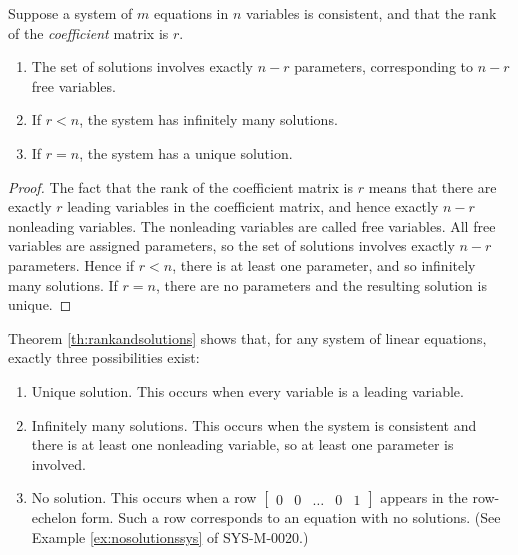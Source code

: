 \documentclass{ximera}
\begin{document}
\begin{theorem}\label{th:rankandsolutions}
Suppose a system of $m$ equations in $n$ variables is consistent, and that the rank of the {\it coefficient} matrix is $r$.

\begin{enumerate}
\item The set of solutions involves exactly $n - r$ parameters, corresponding to $n-r$ free variables.

\item If $r < n$, the system has infinitely many solutions.

\item If $r = n$, the system has a unique solution.

\end{enumerate}
\end{theorem}

\begin{proof}
The fact that the rank of the coefficient matrix is $r$ means that there are exactly $r$ leading variables in the coefficient matrix, and hence exactly $n - r$ nonleading variables. The nonleading variables are called free variables.  All free variables are assigned parameters, so the set of solutions involves exactly $n - r$ parameters. Hence if $r < n$, there is at least one parameter, and so infinitely many solutions. If $r = n$, there are no parameters and the resulting solution is unique.
\end{proof}

Theorem \ref{th:rankandsolutions} shows that, for any system of linear equations, exactly three possibilities exist:

\begin{enumerate}

\item Unique solution. This occurs when every variable is a leading variable.

\item Infinitely many solutions. This occurs when the system is consistent and there is at least one nonleading variable, so at least one parameter is involved.

\item No solution.  This occurs when a row $\left[\begin{array}{cccc|c}  0&0&\ldots &0&1
 \end{array}\right]$ appears in the row-echelon form. Such a row corresponds to an equation with no solutions. (See Example \ref{ex:nosolutionssys} of SYS-M-0020.)

\end{enumerate}
\end{document}
